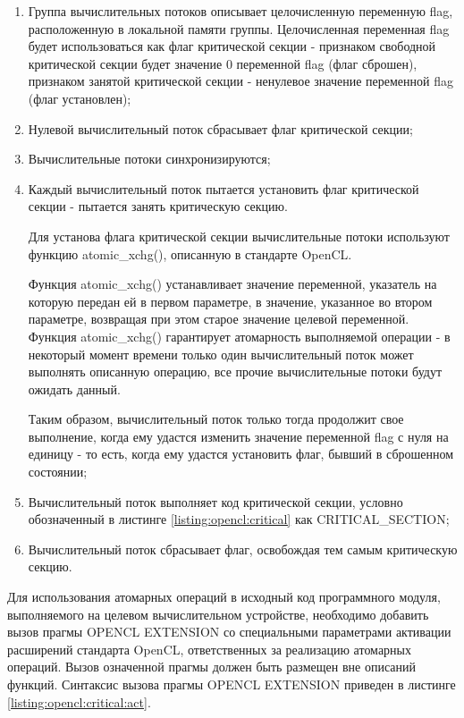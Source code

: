 	\begin{enumerate}

		\item Группа вычислительных потоков описывает целочисленную переменную flag, расположенную в локальной памяти группы. Целочисленная переменная flag будет использоваться как флаг критической секции - признаком свободной критической секции будет значение 0 переменной flag (флаг сброшен), признаком занятой критической секции - ненулевое значение переменной flag (флаг установлен);
		\item Нулевой вычислительный поток сбрасывает флаг критической секции;
		\item Вычислительные потоки синхронизируются;
		\item Каждый вычислительный поток пытается установить флаг критической секции - пытается занять критическую секцию.

			Для установа флага критической секции вычислительные потоки используют функцию atomic\_xchg(), описанную в стандарте OpenCL.

			Функция atomic\_xchg() устанавливает значение переменной, указатель на которую передан ей в первом параметре, в значение, указанное во втором параметре, возвращая при этом старое значение целевой переменной. Функция atomic\_xchg() гарантирует атомарность выполняемой операции - в некоторый момент времени только один вычислительный поток может выполнять описанную операцию, все прочие вычислительные потоки будут ожидать данный.

			Таким образом, вычислительный поток только тогда продолжит свое выполнение, когда ему удастся изменить значение переменной flag с нуля на единицу - то есть, когда ему удастся установить флаг, бывший в сброшенном состоянии;

		\item Вычислительный поток выполняет код критической секции, условно обозначенный в листинге \ref{listing:opencl:critical} как CRITICAL\_SECTION;
		\item Вычислительный поток сбрасывает флаг, освобождая тем самым критическую секцию.

	\end{enumerate}

	Для использования атомарных операций в исходный код программного модуля, выполняемого на целевом вычислительном устройстве, необходимо добавить вызов прагмы OPENCL EXTENSION со специальными параметрами активации расширений стандарта OpenCL, ответственных за реализацию атомарных операций. Вызов означенной прагмы должен быть размещен вне описаний функций. Синтаксис вызова прагмы OPENCL EXTENSION приведен в листинге \ref{listing:opencl:critical:act}.


